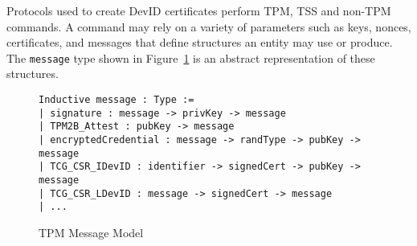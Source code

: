 \documentclass[runningheads]{llncs}
\begin{document}



Protocols used to create DevID certificates perform TPM, TSS and
non-TPM commands. A command may rely on a variety of parameters such
as keys, nonces, certificates, and messages that define structures an
entity may use or produce. The \verb|message| type shown in
Figure~\ref{fig:message-model} is an abstract representation of these
structures.

\begin{figure}[hbtp]
\vspace{-\medskipamount}
\vspace{-\medskipamount}

\begin{lstlisting}[language=Coq]
Inductive message : Type :=
| signature : message -> privKey -> message
| TPM2B_Attest : pubKey -> message
| encryptedCredential : message -> randType -> pubKey -> message
| TCG_CSR_IDevID : identifier -> signedCert -> pubKey -> message
| TCG_CSR_LDevID : message -> signedCert -> message 
| ...
\end{lstlisting}
\vspace{-\medskipamount}
\caption{TPM Message Model}
\label{fig:message-model}
\end{figure}

\end{document}
